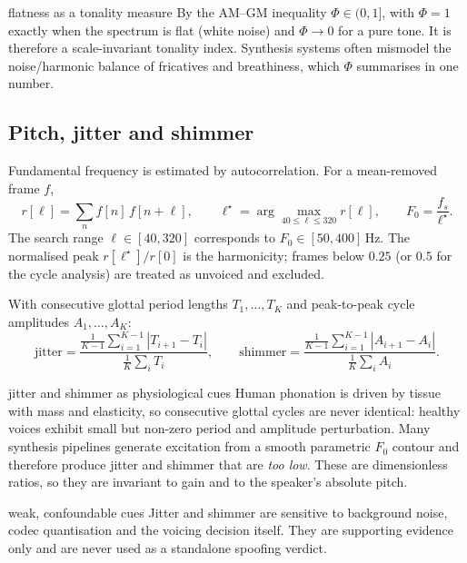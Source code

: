 \documentclass[11pt,a4paper]{article}
\begin{document}
\begin{whybox}{flatness as a tonality measure}
By the AM--GM inequality $\Phi \in (0,1]$, with $\Phi = 1$ exactly when the spectrum is
flat (white noise) and $\Phi \to 0$ for a pure tone. It is therefore a scale-invariant
tonality index. Synthesis systems often mismodel the noise/harmonic balance of
fricatives and breathiness, which $\Phi$ summarises in one number.
\end{whybox}

\subsection{Pitch, jitter and shimmer}

Fundamental frequency is estimated by autocorrelation. For a mean-removed frame $f$,
\begin{equation}
r[\ell] = \sum_n f[n]\,f[n+\ell],
\qquad
\ell^\star = \arg\max_{40 \le \ell \le 320} r[\ell],
\qquad
F_0 = \frac{f_s}{\ell^\star}.
\end{equation}
The search range $\ell \in [40,320]$ corresponds to $F_0 \in [50,400]$\,Hz. The
normalised peak $r[\ell^\star]/r[0]$ is the harmonicity; frames below $0.25$ (or $0.5$
for the cycle analysis) are treated as unvoiced and excluded.

With consecutive glottal period lengths $T_1,\ldots,T_K$ and peak-to-peak cycle
amplitudes $A_1,\ldots,A_K$:
\begin{equation}
\text{jitter} = \frac{\frac{1}{K-1}\sum_{i=1}^{K-1} |T_{i+1}-T_i|}{\frac{1}{K}\sum_i T_i},
\qquad
\text{shimmer} = \frac{\frac{1}{K-1}\sum_{i=1}^{K-1} |A_{i+1}-A_i|}{\frac{1}{K}\sum_i A_i}.
\end{equation}

\begin{whybox}{jitter and shimmer as physiological cues}
Human phonation is driven by tissue with mass and elasticity, so consecutive glottal
cycles are never identical: healthy voices exhibit small but non-zero period and
amplitude perturbation. Many synthesis pipelines generate excitation from a smooth
parametric $F_0$ contour and therefore produce jitter and shimmer that are
\emph{too low}. These are dimensionless ratios, so they are invariant to gain and to
the speaker's absolute pitch.
\end{whybox}

\begin{warnbox}{weak, confoundable cues}
Jitter and shimmer are sensitive to background noise, codec quantisation and the
voicing decision itself. They are supporting evidence only and are never used as a
standalone spoofing verdict.
\end{warnbox}
\end{document}
